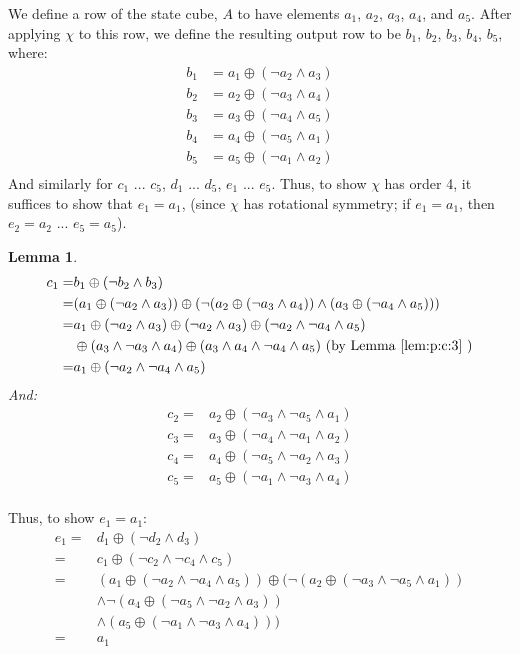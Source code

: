 \documentclass[10pt,twocolumn,twoside]{pnas-new}
\newtheorem{lemma}[theorem]{Lemma}
\begin{document}
We define a row of the state cube, $A$ to have elements $a_1$, $a_2$, $a_3$,
$a_4$, and $a_5$. After applying $\chi$ to this row, we define the resulting
output row to be $b_1$, $b_2$, $b_3$, $b_4$, $b_5$, where:
\begin{align*}
    b_1 & = a_1 \oplus (\lnot a_2 \land a_3) \\
    b_2 & = a_2 \oplus (\lnot a_3 \land a_4) \\
    b_3 & = a_3 \oplus (\lnot a_4 \land a_5) \\
    b_4 & = a_4 \oplus (\lnot a_5 \land a_1) \\
    b_5 & = a_5 \oplus (\lnot a_1 \land a_2) \\
\end{align*}
And similarly for $c_1$ ... $c_5$,  $d_1$ ... $d_5$, $e_1$ ... $e_5$. Thus, to
show $\chi$ has order 4, it suffices to show that $e_1 = a_1$, (since $\chi$
has rotational symmetry; if $e_1 = a_1$, then $e_2 = a_2$ ... $e_5 = a_5$).

\begin{lemma} \label{lem:p:c:4}
\begin{align*}
    c_1 = & b_1 \oplus (\lnot b_2 \land b_3) \\
        = & (a_1 \oplus (\lnot a_2 \land a_3)) \oplus (\lnot (a_2 \oplus (\lnot a_3 \land a_4)) \land (a_3 \oplus (\lnot a_4 \land a_5))) \\
        = & a_1 \oplus (\lnot a_2 \land a_3) \oplus (\lnot a_2 \land a_3) \oplus (\lnot a_2 \land \lnot a_4 \land a_5) \\
          & \oplus (a_3 \land \lnot a_3 \land a_4) \oplus (a_3 \land a_4 \land \lnot a_4 \land a_5) \text{ (by Lemma \ref{lem:p:c:3} )} \\
        = & a_1 \oplus (\lnot a_2 \land \lnot a_4 \land a_5) \\
\end{align*}
And:
\begin{align*}
    c_2 = & a_2 \oplus (\lnot a_3 \land \lnot a_5 \land a_1) \\
    c_3 = & a_3 \oplus (\lnot a_4 \land \lnot a_1 \land a_2) \\
    c_4 = & a_4 \oplus (\lnot a_5 \land \lnot a_2 \land a_3) \\
    c_5 = & a_5 \oplus (\lnot a_1 \land \lnot a_3 \land a_4) \\
\end{align*}
\end{lemma}

Thus, to show $e_1 = a_1$:
\begin{align*}
    e_1 = & d_1 \oplus (\lnot d_2 \land d_3) \\
        = & c_1 \oplus (\lnot c_2 \land \lnot c_4 \land c_5) \\
        = & (a_1 \oplus (\lnot a_2 \land \lnot a_4 \land a_5)) \oplus (\lnot (a_2 \oplus (\lnot a_3 \land \lnot a_5 \land a_1)) \\
          & \land \lnot (a_4 \oplus (\lnot a_5 \land \lnot a_2 \land a_3)) \\
          & \land (a_5 \oplus (\lnot a_1 \land \lnot a_3 \land a_4))) \\
        = & a_1
\end{align*}
\end{document}
